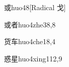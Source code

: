 \begin{verbete}{或}{huo4}{8}[Radical 戈]
\end{verbete}

\begin{verbete}{或者}{huo4zhe3}{8,8}
\end{verbete}

\begin{verbete}{货车}{huo4che1}{8,4}
\end{verbete}

\begin{verbete}{惑星}{huo4xing1}{12,9}
\end{verbete}


